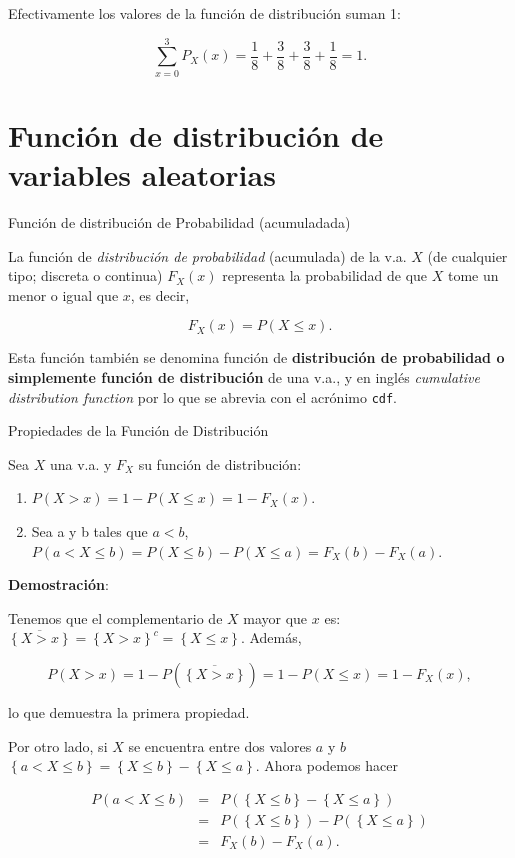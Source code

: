 \documentclass[
  letterpaper,
  DIV=11,
  numbers=noendperiod]{scrreprt}
\providecommand{\tightlist}{%
  \setlength{\itemsep}{0pt}\setlength{\parskip}{0pt}}\usepackage{longtable,booktabs,array}
\begin{document}
Efectivamente los valores de la función de distribución suman 1:

\[\sum_{x=0}^3 P_X(x)= \frac18+\frac38+\frac38+\frac18=1.\]

\section{Función de distribución de variables
aleatorias}\label{funciuxf3n-de-distribuciuxf3n-de-variables-aleatorias}

Función de distribución de Probabilidad (acumuladada)

La función de \emph{distribución de probabilidad} (acumulada) de la v.a.
\(X\) (de cualquier tipo; discreta o continua) \(F_{X}(x)\) representa
la probabilidad de que \(X\) tome un menor o igual que \(x\), es decir,

\[F_{X}(x)=P(X\leq x).\]

Esta función también se denomina función de \textbf{distribución de
probabilidad o simplemente función de distribución} de una v.a., y en
inglés \emph{cumulative distribution function} por lo que se abrevia con
el acrónimo \texttt{cdf}.

Propiedades de la Función de Distribución

Sea \(X\) una v.a. y \(F_{X}\) su función de distribución:

\begin{enumerate}
\def\labelenumi{\arabic{enumi}.}
\tightlist
\item
  \(P(X>x)=1-P(X\leq x)=1-F_{X}(x).\)
\item
  Sea a y b tales que \(a<b\),
  \(P(a<X\leq b)=P(X\leq b)-P(X\leq a)=F_{X}(b)-F_{X}(a).\)
\end{enumerate}

\textbf{Demostración}:

Tenemos que el complementario de \(X\) mayor que \(x\) es:
\(\overline{\left\{X>x\right\}}=\left\{X>x\right\}^c=\left\{X\leq x\right\}\).
Además,

\[P(X>x)=1-P(\overline{\left\{X>x\right\}})=1-P(X\leq x)=1-F_{X}(x),\]

lo que demuestra la primera propiedad.

Por otro lado, si \(X\) se encuentra entre dos valores \(a\) y \(b\)
\(\left\{a< X \leq b\right\}= \left\{X\leq b\right\}-\left\{X\leq  a\right\}\).
Ahora podemos hacer

\begin{eqnarray*}
P(a<X\leq b)&=&P(\left\{X\leq b\right\}-\left\{X\leq a\right\})\\
&=& P(\left\{X\leq b\right\})-P(\left\{X\leq a\right\})\\
&=& F_{X}(b)-F_{X}(a).
\end{eqnarray*}
\end{document}
